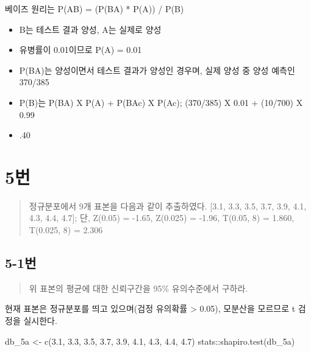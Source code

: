 \documentclass[
  letterpaper,
  DIV=11,
  numbers=noendperiod]{scrreprt}
\newenvironment{Shaded}{\begin{snugshade}}{\end{snugshade}}
\newcommand{\FloatTok}[1]{\textcolor[rgb]{0.68,0.00,0.00}{#1}}
\newcommand{\FunctionTok}[1]{\textcolor[rgb]{0.28,0.35,0.67}{#1}}
\newcommand{\NormalTok}[1]{\textcolor[rgb]{0.00,0.23,0.31}{#1}}
\newcommand{\OtherTok}[1]{\textcolor[rgb]{0.00,0.23,0.31}{#1}}
\newcommand{\SpecialCharTok}[1]{\textcolor[rgb]{0.37,0.37,0.37}{#1}}
\providecommand{\tightlist}{%
  \setlength{\itemsep}{0pt}\setlength{\parskip}{0pt}}\usepackage{longtable,booktabs,array}
\begin{document}
베이즈 원리는 P(A\textbar B) = (P(B\textbar A) * P(A)) / P(B)

\begin{itemize}
\tightlist
\item
  B는 테스트 결과 양성, A는 실제로 양성
\item
  유병률이 0.01이므로 P(A) = 0.01
\item
  P(B\textbar A)는 양성이면서 테스트 결과가 양성인 경우며, 실제 양성 중
  양성 예측인 370/385
\item
  P(B)는 P(B\textbar A) X P(A) + P(B\textbar Ac) X P(Ac); (370/385) X
  0.01 + (10/700) X 0.99
\item
  .40
\end{itemize}

\hypertarget{uxbc88-74}{%
\chapter*{5번}\label{uxbc88-74}}


\begin{quote}
정규분포에서 9개 표본을 다음과 같이 추출하였다. {[}3.1, 3.3, 3.5, 3.7,
3.9, 4.1, 4.3, 4.4, 4.7{]}; 단, Z(0.05) = -1.65, Z(0.025) = -1.96,
T(0.05, 8) = 1.860, T(0.025, 8) = 2.306
\end{quote}

\hypertarget{uxbc88-75}{%
\section*{5-1번}\label{uxbc88-75}}


\begin{quote}
위 표본의 평균에 대한 신뢰구간을 95\% 유의수준에서 구하라.
\end{quote}

현재 표본은 정규분포를 띄고 있으며(검정 유의확률 \textgreater{} 0.05),
모분산을 모르므로 t 검정을 실시한다.

\begin{Shaded}
\begin{Highlighting}[]
\NormalTok{db\_5a }\OtherTok{\textless{}{-}} \FunctionTok{c}\NormalTok{(}\FloatTok{3.1}\NormalTok{, }\FloatTok{3.3}\NormalTok{, }\FloatTok{3.5}\NormalTok{, }\FloatTok{3.7}\NormalTok{, }\FloatTok{3.9}\NormalTok{, }\FloatTok{4.1}\NormalTok{, }\FloatTok{4.3}\NormalTok{, }\FloatTok{4.4}\NormalTok{, }\FloatTok{4.7}\NormalTok{)}
\NormalTok{stats}\SpecialCharTok{::}\FunctionTok{shapiro.test}\NormalTok{(db\_5a)}
\end{Highlighting}
\end{Shaded}
\end{document}
